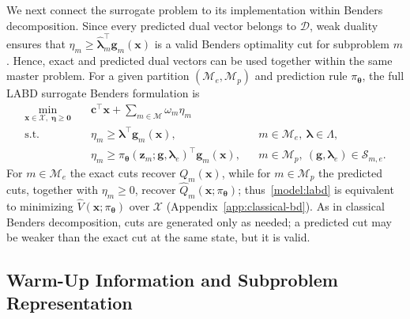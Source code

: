 We next connect the surrogate problem to its implementation within Benders decomposition. Since every predicted dual vector belongs to $\mathcal D$, weak duality ensures that $\eta_m\ge\widehat{\boldsymbol\lambda}_m^\top\mathbf g_m(\mathbf x)$ is a valid Benders optimality cut for subproblem $m$. Hence, exact and predicted dual vectors can be used together within the same master problem. For a given partition $(\mathcal M_e,\mathcal M_p)$ and prediction rule $\pi_{\boldsymbol\theta}$, the full LABD surrogate Benders formulation is
\begin{subequations}\label{model:labd}
\begin{align}
\min_{\mathbf x\in\mathcal X,\;\boldsymbol\eta\ge\mathbf 0}\quad & \mathbf c^\top\mathbf x+\sum_{m\in\mathcal M}\omega_m\eta_m\\
\text{s.t.}\quad & \eta_m\ge\boldsymbol\lambda^\top\mathbf g_m(\mathbf x), && m\in\mathcal M_e,\ \boldsymbol\lambda\in\Lambda, \label{model:exact-cuts}\\
& \eta_m\ge\pi_{\boldsymbol\theta}(\mathbf z_m;\mathbf g,\boldsymbol\lambda_e)^\top\mathbf g_m(\mathbf x), && m\in\mathcal M_p,\ (\mathbf g,\boldsymbol\lambda_e)\in\mathcal S_{m,e}. \label{model:predicted-cuts}
\end{align}
\end{subequations}
For $m\in\mathcal M_e$ the exact cuts recover $Q_m(\mathbf x)$, while for $m\in\mathcal M_p$ the predicted cuts, together with $\eta_m\ge0$, recover $\widehat Q_m(\mathbf x;\pi_{\boldsymbol\theta})$; thus~\eqref{model:labd} is equivalent to minimizing $\widehat V(\mathbf x;\pi_{\boldsymbol\theta})$ over $\mathcal X$ (Appendix~\ref{app:classical-bd}). As in classical Benders decomposition, cuts are generated only as needed; a predicted cut may be weaker than the exact cut at the same state, but it is valid.

\subsection{Warm-Up Information and Subproblem Representation}\label{subsec:warmup}

